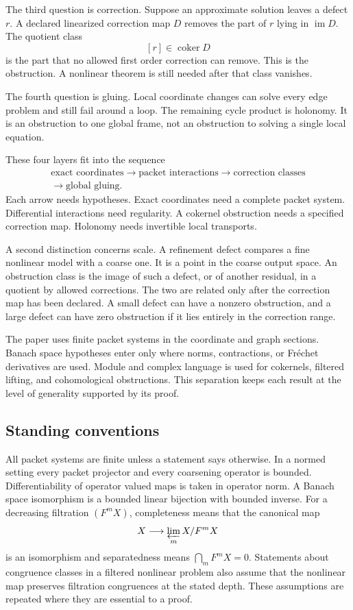 \documentclass[11pt,a4paper]{article}
\theoremstyle{plain}
\theoremstyle{definition}
\theoremstyle{remark}
\newcommand{\im}{\operatorname{im}}
\newcommand{\coker}{\operatorname{coker}}
\begin{document}
The third question is correction.  Suppose an approximate solution leaves a defect $r$.  A declared linearized correction map $D$ removes the part of $r$ lying in $\im D$.  The quotient class
\[
[r]\in\coker D
\]
is the part that no allowed first order correction can remove.  This is the obstruction.  A nonlinear theorem is still needed after that class vanishes.

The fourth question is gluing.  Local coordinate changes can solve every edge problem and still fail around a loop.  The remaining cycle product is holonomy.  It is an obstruction to one global frame, not an obstruction to solving a single local equation.

These four layers fit into the sequence
\[
\begin{gathered}
\text{exact coordinates}
\longrightarrow
\text{packet interactions}
\longrightarrow
\text{correction classes}
\\
\longrightarrow
\text{global gluing}.
\end{gathered}
\]
Each arrow needs hypotheses.  Exact coordinates need a complete packet system.  Differential interactions need regularity.  A cokernel obstruction needs a specified correction map.  Holonomy needs invertible local transports.

A second distinction concerns scale.  A refinement defect compares a fine nonlinear model with a coarse one.  It is a point in the coarse output space.  An obstruction class is the image of such a defect, or of another residual, in a quotient by allowed corrections.  The two are related only after the correction map has been declared.  A small defect can have a nonzero obstruction, and a large defect can have zero obstruction if it lies entirely in the correction range.

The paper uses finite packet systems in the coordinate and graph sections.  Banach space hypotheses enter only where norms, contractions, or Fr\'echet derivatives are used.  Module and complex language is used for cokernels, filtered lifting, and cohomological obstructions.  This separation keeps each result at the level of generality supported by its proof.

\subsection*{Standing conventions}
All packet systems are finite unless a statement says otherwise.  In a normed setting every packet projector and every coarsening operator is bounded.  Differentiability of operator valued maps is taken in operator norm.  A Banach space isomorphism is a bounded linear bijection with bounded inverse.  For a decreasing filtration $(F^mX)$, completeness means that the canonical map
\[
X\longrightarrow\varprojlim_m X/F^mX
\]
is an isomorphism and separatedness means $\bigcap_mF^mX=0$.  Statements about congruence classes in a filtered nonlinear problem also assume that the nonlinear map preserves filtration congruences at the stated depth.  These assumptions are repeated where they are essential to a proof.
\end{document}
